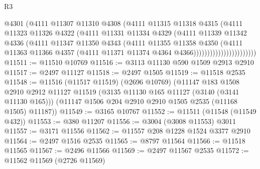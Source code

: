 \begin{lexlean}{R3}
\begin{coremodule}
                                @4301
                                (@4111
                                  @11307
                                  @11310
                                  @4308
                                  (@4111
                                    @11315
                                    @11318
                                    @4315
                                    (@4111
                                      @11323
                                      @11326
                                      @4322
                                      (@4111
                                        @11331
                                        @11334
                                        @4329
                                        (@4111
                                          @11339
                                          @11342
                                          @4336
                                          (@4111
                                            @11347
                                            @11350
                                            @4343
                                            (@4111
                                              @11355
                                              @11358
                                              @4350
                                              (@4111
                                                @11363
                                                @11366
                                                @4357
                                                (@4111
                                                  @11371
                                                  @11374
                                                  @4364
                                                  @4366)))))))))))))))))))))))
@11511 := @11510 @10769
@11516 := @3113 @11130 @590 @1509 @2913 @2910
@11517 := @2497 @11127
@11518 := @2497 @1505
@11519 := @11518 @2535
@11548 := @11516
    (@11517 @11519)
    (@2696 @10769)
    (@11147
      @183
      @1508
      @2910
      @2912
      @11127
      @11519
      (@3135 @11130 @165 @11127 (@3140 (@3141 @11130 @165)))
      (@11147 @1506 @204 @2910 @2910 @1505 @2535 (@11168 @1505) @11187))
@11549 := @3165 @10767
@11552 := @11511 (@11548 (@11549 @432))
@11553 := @380 @11207
@11556 := @3004 (@3008 @11553) @3011
@11557 := @3171 @11556
@11562 := @11557 @208 @1228 @1524 @3377 @2910
@11564 := @2497 @1516 @2535
@11565 := @8797 @11564
@11566 := @11518 @11565
@11567 := @2496 @11566
@11569 := @2497 @11567 @2535
@11572 := @11562 @11569 (@2726 @11569)

\end{coremodule}
\end{lexlean}
